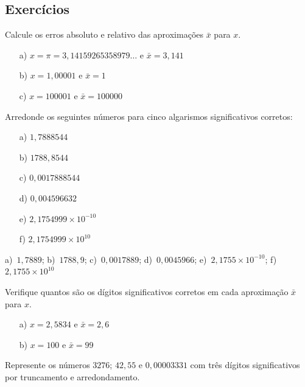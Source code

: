 \subsection*{Exercícios}

\begin{exer} Calcule os erros absoluto e relativo das aproximações $\bar{x}$ para $x$.
  \begin{itemize}
  \item[a)] $x=\pi=3,14159265358979\ldots$ e $\bar{x}=3,141$
  \item[b)] $x=1,00001$ e $\bar{x}=1$
  \item[c)] $x=100001$ e $\bar{x}=100000$
  \end{itemize}
\end{exer}


\begin{exer} Arredonde os seguintes números para cinco algarismos significativos corretos:
  \begin{multicols}{3}
    \begin{itemize}
    \item [a)] $1,7888544$
    \item [b)] $1788,8544$
    \item [c)] $0,0017888544$
    \item [d)] $0,004596632$
    \item [e)] $ 2,1754999\times 10^{-10}$
    \item [f)] $ 2,1754999\times 10^{10}$
    \end{itemize}
  \end{multicols}
\end{exer}
\begin{resp}
  
a)~$1,7889$; b)~$1788,9$; c)~$0,0017889$; d)~$0,0045966$; e)~$2,1755\times 10^{-10}$; f)~$2,1755\times 10^{10}$    
  
\end{resp}

\begin{exer}
Verifique quantos são os dígitos significativos corretos em cada aproximação $\bar{x}$ para $x$.
\begin{itemize}
\item[a)] $x=2,5834$ e $\bar{x}=2,6$
\item[b)] $x=100$ e $\bar{x}=99$
\end{itemize}
\end{exer}

\begin{exer}  Represente os números $3276$; $42,55$ e $0,00003331$ com três dígitos significativos por truncamento e arredondamento.
\end{exer}

